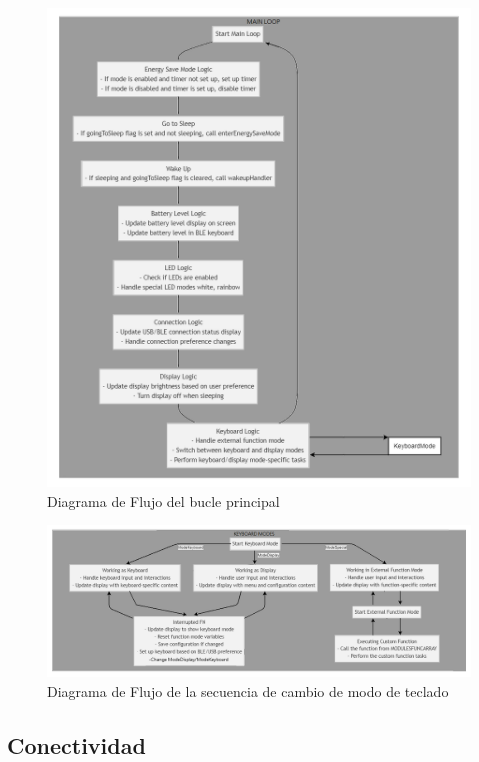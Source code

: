 \begin{figure}[H]
    \centering
    \includegraphics[width=1\textwidth]{imagenes/Capitulos/Cap07/MainLoop.png}
    \caption{Diagrama de Flujo del bucle principal}
    \label{fig:MainLoop}
\end{figure}

\begin{figure}[H]
    \centering
    \includegraphics[width=1\textwidth]{imagenes/Capitulos/Cap07/EstadosKeyboard.png}
    \caption{Diagrama de Flujo de la secuencia de cambio de modo de teclado}
    \label{fig:EstadosKeyboard}
\end{figure}

\subsection{Conectividad}

